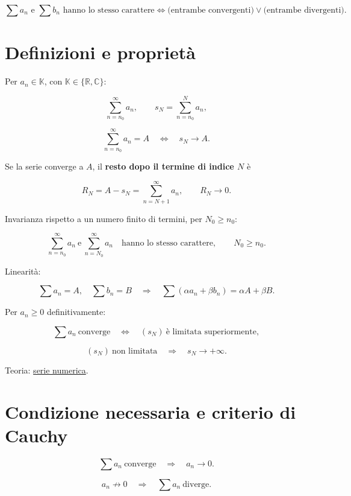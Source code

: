 \[
\sum a_n\text{ e }\sum b_n\text{ hanno lo stesso carattere}
\Longleftrightarrow
\bigl(\text{entrambe convergenti}\bigr)
\lor
\bigl(\text{entrambe divergenti}\bigr).
\]

\section{Definizioni e proprietà}\label{definizioni-e-proprietuxe0}

Per \(a_n\in\mathbb K\), con \(\mathbb K\in\{\mathbb R,\mathbb C\}\):

\[
\displaystyle
\sum_{n=n_0}^{\infty}a_n,
\qquad
s_N=\sum_{n=n_0}^{N}a_n,
\]

\[
\displaystyle
\sum_{n=n_0}^{\infty}a_n=A
\quad\Longleftrightarrow\quad
s_N\to A.
\]

Se la serie converge a \(A\), il \textbf{resto dopo il termine di indice \(N\)} è

\[
R_N=A-s_N=\sum_{n=N+1}^{\infty}a_n,
\qquad
R_N\to0.
\]

Invarianza rispetto a un numero finito di termini, per \(N_0\ge n_0\):

\[
\displaystyle
\sum_{n=n_0}^{\infty}a_n
\ \text{e}\
\sum_{n=N_0}^{\infty}a_n
\quad
\text{hanno lo stesso carattere},
\qquad N_0\ge n_0.
\]

Linearità:

\[
\displaystyle
\sum a_n=A,\quad \sum b_n=B
\quad\Longrightarrow\quad
\sum(\alpha a_n+\beta b_n)=\alpha A+\beta B.
\]

Per \(a_n\ge0\) definitivamente:

\[
\displaystyle
\sum a_n\ \text{converge}
\quad\Longleftrightarrow\quad
(s_N)\ \text{è limitata superiormente},
\]

\[
\displaystyle
(s_N)\ \text{non limitata}
\quad\Longrightarrow\quad
s_N\to+\infty.
\]

Teoria: \href{https://ingegnerismo.it/matematica/serie-numerica/}{serie numerica}.

\section{Condizione necessaria e criterio di Cauchy}\label{condizione-necessaria-e-criterio-di-cauchy}

\[
\displaystyle
\sum a_n\ \text{converge}
\quad\Longrightarrow\quad
a_n\to0.
\]

\[
\displaystyle
a_n\not\to0
\quad\Longrightarrow\quad
\sum a_n\ \text{diverge}.
\]

